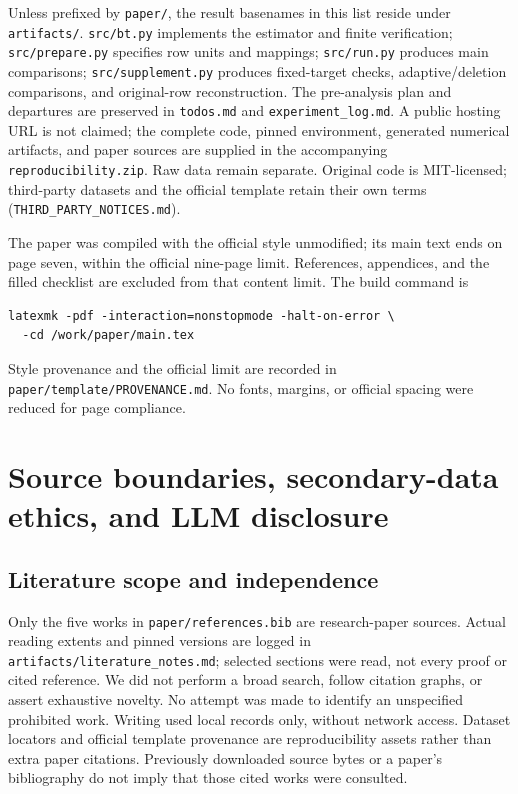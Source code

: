 Unless prefixed by \texttt{paper/}, the result basenames in this list reside under \texttt{artifacts/}. \texttt{src/bt.py} implements the estimator and finite verification; \texttt{src/prepare.py} specifies row units and mappings; \texttt{src/run.py} produces main comparisons; \texttt{src/supplement.py} produces fixed-target checks, adaptive/deletion comparisons, and original-row reconstruction. The pre-analysis plan and departures are preserved in \texttt{todos.md} and \texttt{experiment\_log.md}. A public hosting URL is not claimed; the complete code, pinned environment, generated numerical artifacts, and paper sources are supplied in the accompanying \texttt{reproducibility.zip}. Raw data remain separate. Original code is MIT-licensed; third-party datasets and the official template retain their own terms (\texttt{THIRD\_PARTY\_NOTICES.md}).

The paper was compiled with the official style unmodified; its main text ends on page seven, within the official nine-page limit. References, appendices, and the filled checklist are excluded from that content limit. The build command is
\begin{verbatim}
latexmk -pdf -interaction=nonstopmode -halt-on-error \
  -cd /work/paper/main.tex
\end{verbatim}
Style provenance and the official limit are recorded in \texttt{paper/template/PROVENANCE.md}. No fonts, margins, or official spacing were reduced for page compliance.

\section{Source boundaries, secondary-data ethics, and LLM disclosure}
\label{app:ethics}
\subsection{Literature scope and independence}
Only the five works in \texttt{paper/references.bib} are research-paper sources. Actual reading extents and pinned versions are logged in \texttt{artifacts/literature\_notes.md}; selected sections were read, not every proof or cited reference. We did not perform a broad search, follow citation graphs, or assert exhaustive novelty. No attempt was made to identify an unspecified prohibited work. Writing used local records only, without network access. Dataset locators and official template provenance are reproducibility assets rather than extra paper citations. Previously downloaded source bytes or a paper's bibliography do not imply that those cited works were consulted.

